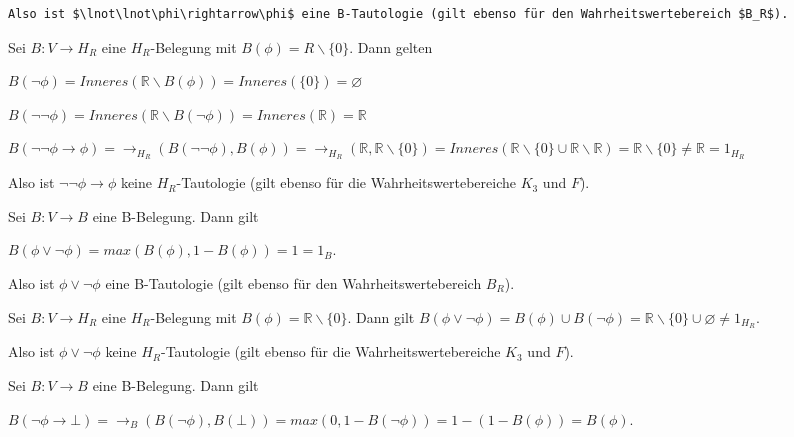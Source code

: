 \documentclass[a4paper]{article}
\begin{document}
\begin{multicols}{3}
\begin{verbatim}
Also ist $\lnot\lnot\phi\rightarrow\phi$ eine B-Tautologie (gilt ebenso für den Wahrheitswertebereich $B_R$).
\end{verbatim}

  \begin{itemize*}
    \item
          Sei $B:V\rightarrow H_R$ eine $H_R$-Belegung mit
          $B(\phi) =R\backslash\{0\}$. Dann gelten

          \begin{itemize*}
            \item
                  $B(\lnot\phi) = Inneres(\mathbb{R}\backslash B(\phi)) = Inneres(\{0\}) =\varnothing$
            \item
                  $B(\lnot\lnot\phi) = Inneres(\mathbb{R}\backslash B(\lnot\phi)) = Inneres(\mathbb{R}) = \mathbb{R}$
            \item
                  $B(\lnot\lnot\phi\rightarrow\phi) = \rightarrow_{H_R} (B(\lnot\lnot\phi),B(\phi)) = \rightarrow_{H_R} (\mathbb{R},\mathbb{R}\backslash \{0\}) = Inneres(\mathbb{R}\backslash\{0\}\cup\mathbb{R}\backslash\mathbb{R}) = \mathbb{R}\backslash\{0\}\not =\mathbb{R}= 1_{H_R}$
          \end{itemize*}

          Also ist $\lnot\lnot\phi\rightarrow\phi$ keine $H_R$-Tautologie (gilt
          ebenso für die Wahrheitswertebereiche $K_3$ und $F$).
    \item
          Sei $B:V\rightarrow B$ eine B-Belegung. Dann gilt

          $B(\phi\vee\lnot\phi) = max(B(\phi), 1 -B(\phi)) = 1 = 1_B$.

          Also ist $\phi\vee\lnot\phi$ eine B-Tautologie (gilt ebenso für den
          Wahrheitswertebereich $B_R$).
    \item
          Sei $B:V\rightarrow H_R$ eine $H_R$-Belegung mit
          $B(\phi)=\mathbb{R}\backslash\{0\}$. Dann gilt
          $B(\phi\vee\lnot\phi) = B(\phi)\cup B(\lnot\phi) = \mathbb{R}\backslash\{0\}\cup \varnothing \not= 1_{H_R}$.

          Also ist $\phi\vee\lnot\phi$ keine $H_R$-Tautologie (gilt ebenso für
          die Wahrheitswertebereiche $K_3$ und $F$).
    \item
          Sei $B:V\rightarrow B$ eine B-Belegung. Dann gilt

          $B(\lnot\phi\rightarrow\bot) = \rightarrow_B(B(\lnot\phi),B(\bot)) = max(0,1-B(\lnot \phi)) = 1 -( 1 -B(\phi)) =B(\phi)$.


\end{itemize*}
\end{multicols}
\end{document}
